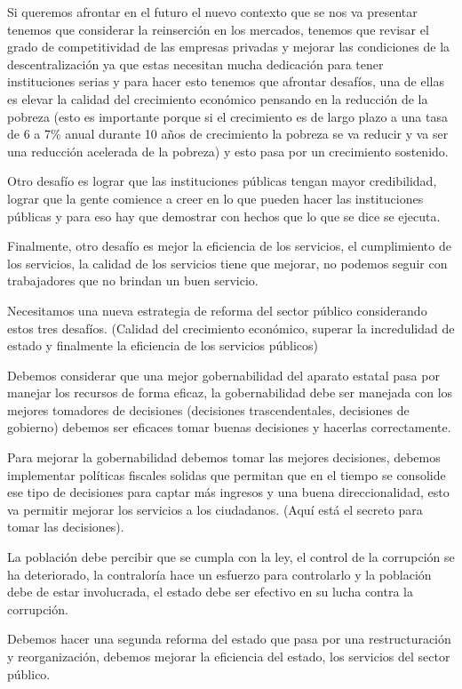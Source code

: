 \documentclass[
  letterpaper,
  DIV=11,
  numbers=noendperiod]{scrartcl}
\begin{document}
Si queremos afrontar en el futuro el nuevo contexto que se nos va
presentar tenemos que considerar la reinserción en los mercados, tenemos
que revisar el grado de competitividad de las empresas privadas y
mejorar las condiciones de la descentralización ya que estas necesitan
mucha dedicación para tener instituciones serias y para hacer esto
tenemos que afrontar desafíos, una de ellas es elevar la calidad del
crecimiento económico pensando en la reducción de la pobreza (esto es
importante porque si el crecimiento es de largo plazo a una tasa de 6 a
7\% anual durante 10 años de crecimiento la pobreza se va reducir y va
ser una reducción acelerada de la pobreza) y esto pasa por un
crecimiento sostenido.

Otro desafío es lograr que las instituciones públicas tengan mayor
credibilidad, lograr que la gente comience a creer en lo que pueden
hacer las instituciones públicas y para eso hay que demostrar con hechos
que lo que se dice se ejecuta.

Finalmente, otro desafío es mejor la eficiencia de los servicios, el
cumplimiento de los servicios, la calidad de los servicios tiene que
mejorar, no podemos seguir con trabajadores que no brindan un buen
servicio.

Necesitamos una nueva estrategia de reforma del sector público
considerando estos tres desafíos. (Calidad del crecimiento económico,
superar la incredulidad de estado y finalmente la eficiencia de los
servicios públicos)

Debemos considerar que una mejor gobernabilidad del aparato estatal pasa
por manejar los recursos de forma eficaz, la gobernabilidad debe ser
manejada con los mejores tomadores de decisiones (decisiones
trascendentales, decisiones de gobierno) debemos ser eficaces tomar
buenas decisiones y hacerlas correctamente.

Para mejorar la gobernabilidad debemos tomar las mejores decisiones,
debemos implementar políticas fiscales solidas que permitan que en el
tiempo se consolide ese tipo de decisiones para captar más ingresos y
una buena direccionalidad, esto va permitir mejorar los servicios a los
ciudadanos. (Aquí está el secreto para tomar las decisiones).

La población debe percibir que se cumpla con la ley, el control de la
corrupción se ha deteriorado, la contraloría hace un esfuerzo para
controlarlo y la población debe de estar involucrada, el estado debe ser
efectivo en su lucha contra la corrupción.

Debemos hacer una segunda reforma del estado que pasa por una
restructuración y reorganización, debemos mejorar la eficiencia del
estado, los servicios del sector público.
\end{document}
